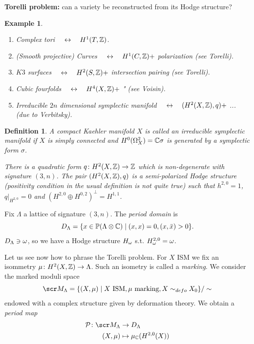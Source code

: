 \documentclass[A4paper, british]{amsart}
\theoremstyle{darkgreentheorem}
\theoremstyle{darkbluedefinition}
\newtheorem{defn}[thm]{Definition}
\theoremstyle{darkredexample}
\newtheorem{exa}[thm]{Example}
\theoremstyle{remark}
\newcommand{\1}{\mathbbm{1}}
\newcommand{\ot}{\otimes}
\newcommand{\op}{\oplus}
\newcommand{\prp}{^{\perp}}
\begin{document}
\textbf{Torelli problem:} can a variety be reconstructed from its Hodge structure?

\begin{exa}
    \begin{enumerate}
	\item Complex tori $\quad \leftrightarrow \quad H^{1}(T,\mathbb{Z})$.
	\item (Smooth projective) Curves $\quad \leftrightarrow \quad H^{1}(C,\mathbb{Z})+$ polarization (see Torelli).
	\item $K3$ surfaces $\quad \leftrightarrow \quad H^{2}(S,\mathbb{Z})+$ intersection pairing (see Torelli).
	\item Cubic fourfolds $\quad \leftrightarrow \quad H^{4}(X,\mathbb{Z})+$ " (see Voisin).
	\item Irreducible $2n$ dimensional symplectic manifold $\quad \leftrightarrow \quad (H^{2}(X,\mathbb{Z}),q)+$ ... (due to Verbitsky).
    \end{enumerate}
\end{exa}

\begin{defn}
    A compact Kaehler manifold $X$ is called an \textit{irreducible symplectic manifold} if $X$ is simply connected and $H^{0}(\Omega_{X}^{2})=\mathbb{C}\sigma $ is generated by a symplectic form $\sigma$.

    There is a quadratic form $q\colon H^{2}(X,\mathbb{Z})\to \mathbb{Z}$ which is non-degenerate with signature $(3,n)$.
    The pair $(H^{2}(X,\mathbb{Z}),q)$ is a semi-polarized Hodge structure (positivity condition in the usual definition is not quite true) such that $h^{2,0}=1$, $q|_{H^{2,0}}=0$ and $(H^{2,0}\op H^{0,2})\prp=H^{1,1}$.
\end{defn}

Fix $\Lambda$ a lattice of signature $(3,n)$.
The \textit{period domain} is
\[ D_{\Lambda}=\{ x\in \P(\Lambda \ot \C)\mid (x,x)=0,(x,\bar{x})>0 \}. \]
$D_{\Lambda}\ni \omega$, so we have a Hodge structure $H_{\omega}$ s.t. $H_{\omega}^{2,0}=\omega$.

Let us see now how to phrase the Torelli problem.
For $X$ ISM we fix an isommetry $\mu\colon H^{2}(X,\mathbb{Z})\to \Lambda$.
Such an isometry is called a \textit{marking}.
We consider the marked moduli space
\[ \M_{\Lambda}=\{(X,\mu)\mid X \text{ ISM},\mu \text{ marking}, X\sim_{defo}X_{0} \}/\sim \]
endowed with a complex structure given by deformation theory.
We obtain a \textit{period map}
\begin{align*}
    \calP\colon \M_{\Lambda}& \to D_{\Lambda} \\
    (X,\mu) & \mapsto \mu_{\C}(H^{2,0}(X))
\end{align*}
\end{document}
